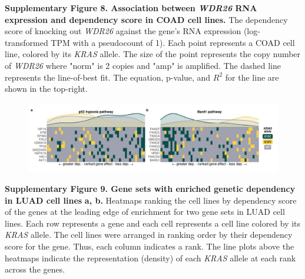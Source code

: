 \documentclass[english, 10pt, letterpaper]{article}
\newcommand{\KRAS}{\emph{KRAS}}
\begin{document}
\noindent \textbf{Supplementary Figure 8. Association between \emph{WDR26} RNA expression and dependency score in COAD cell lines.}
The dependency score of knocking out \emph{WDR26} against the gene's RNA expression (log-transformed TPM with a pseudocount of 1). Each point represents a COAD cell line, colored by its \KRAS{} allele. The size of the point represents the copy number of \emph{WDR26} where "norm" is 2 copies and "amp" is amplified. The dashed line represents the line-of-best fit. The equation, p-value, and $R^2$ for the line are shown in the top-right.
\newpage


\begin{figure}[h!]
\centering
\includegraphics[width=180mm]{figures/Supp_Fig_9.jpeg}
\label{sfig:luad-dependency-gsea}
\end{figure}

\noindent \textbf{Supplementary Figure 9. Gene sets with enriched genetic dependency in LUAD cell lines}
\textbf{a, b.} Heatmaps ranking the cell lines by dependency score of the genes at the leading edge of enrichment for two gene sets in LUAD cell lines. Each row represents a gene and each cell represents a cell line colored by its \KRAS{} allele. The cell lines were arranged in ranking order by their dependency score for the gene. Thus, each column indicates a rank. The line plots above the heatmaps indicate the representation (density) of each \KRAS{} allele at each rank across the genes.
\newpage
\end{document}
